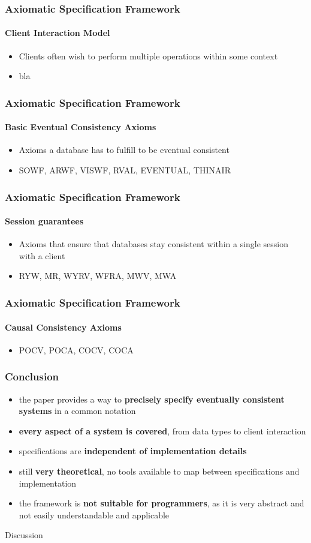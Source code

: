 \documentclass[11pt]{beamer}
\begin{document}
\begin{frame}
\frametitle{Axiomatic Specification Framework}
\framesubtitle{Client Interaction Model}
\begin{itemize}
\item Clients often wish to perform multiple operations within some context
\item bla   
\end{itemize}
\end{frame}

\begin{frame}
\frametitle{Axiomatic Specification Framework}
\framesubtitle{Basic Eventual Consistency Axioms}
\begin{itemize}
\item Axioms a database has to fulfill to be eventual consistent
\item SOWF, ARWF, VISWF, RVAL, EVENTUAL, THINAIR
\end{itemize}
\end{frame}

\begin{frame}
\frametitle{Axiomatic Specification Framework}
\framesubtitle{Session guarantees}
\begin{itemize}
\item Axioms that ensure that databases stay consistent within a single session with a client
\item RYW, MR, WYRV, WFRA, MWV, MWA
\end{itemize}
\end{frame}

\begin{frame}
\frametitle{Axiomatic Specification Framework}
\framesubtitle{Causal Consistency Axioms}
\begin{itemize}
\item POCV, POCA, COCV, COCA
\end{itemize}
\end{frame}

\begin{frame}
\frametitle{Conclusion}
\begin{itemize}
\item<pro@1-> the paper provides a way to \textbf{precisely specify eventually consistent systems} in a common notation
\item<pro@1-> \textbf{every aspect of a system is covered}, from data types to client interaction
\item<pro@1-> specifications are \textbf{independent of implementation details}
\item<con@1-> still \textbf{very theoretical}, no tools available to map between specifications and implementation 
\item<con@1-> the framework is \textbf{not suitable for programmers}, as it is very abstract and not easily understandable and applicable
\end{itemize}
\end{frame}

\begin{frame}
\begin{center}
\begin{Huge}
Discussion
\end{Huge}
\end{center}
\end{frame}
\end{document}
